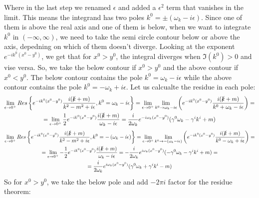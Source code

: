 \documentclass{article}
\begin{document}
Where in the last step we renamed $\epsilon$ and added a $\epsilon^2$ term that vanishes in the limit. This means the integrand has two poles $k^0 = \pm \left(\omega_k - i\epsilon\right)$. Since one of them is above the real axis and one of them is below, when we want to integrate $k^0$ in $(-\infty, \infty)$, we need to take the semi circle contour below or above the axis, depedning on which of them doesn't diverge. Looking at the exponent $e^{-ik^0(x^0 - y^0)}$, we get that for $x^0 > y^0$, the integral diverges when $\Im(k^0) > 0$ and vise versa. So, we take the below contour if $x^0 > y^0$ and the above contour if $x^0 < y^0$. The below contour contains the pole $k^0 = \omega_k - i\epsilon$ while the above contour contains the pole $k^0 = - \omega_k + i\epsilon$. Let us calcualte the residue in each pole:
\begin{equation}
\begin{gathered}
    \lim_{\epsilon\rightarrow0^{+}} Res\left\{e^{-ik^0(x^0 - y^0)}\frac{i(\slashed{k} +m )}{k^2 - m^2 + i\epsilon}, k^0 = \omega_k - i\epsilon\right\} =
    \lim_{\epsilon\rightarrow0^{+}} \lim_{k^0 \rightarrow \omega_k - i\epsilon}
    \left(e^{-ik^0(x^0 - y^0)}\frac{i(\slashed{k} + m)}{k^0 + \omega_k - i\epsilon}\right) = \\ =
    \lim_{\epsilon\rightarrow0^{+}} \frac{1}{2}e^{-ik^0(x^0 - y^0)}\frac{i(\slashed{k} + m)}{\omega_k - i\epsilon} = \frac{i}{2\omega_k}e^{-i\omega_k(x^0 - y^0)}(\gamma^0 \omega_k - \gamma^ik^i + m)
\end{gathered}
\end{equation}
\begin{equation}
\begin{gathered}
    \lim_{\epsilon\rightarrow0^{+}} Res\left\{e^{-ik^0(x^0 - y^0)}\frac{i(\slashed{k} +m )}{k^2 - m^2 + i\epsilon}, k^0 = - \left(\omega_k - i\epsilon\right)\right\} =
    \lim_{\epsilon\rightarrow0^{+}} \lim_{k^0 \rightarrow - \left(\omega_k - i\epsilon\right)}
    \left(e^{-ik^0(x^0 - y^0)}\frac{i(\slashed{k} + m)}{k^0 - \omega_k + i\epsilon}\right) = \\ =
    \lim_{\epsilon\rightarrow0^{+}} -\frac{1}{2}e^{-ik^0(x^0 - y^0)}\frac{i(\slashed{k} + m)}{\omega_k - i\epsilon} = -\frac{i}{2\omega_k}e^{i\omega_k(x^0 - y^0)}(-\gamma^0\omega_k - \gamma^ik^i + m) = \\ = \frac{i}{2\omega_k}e^{i\omega_k(x^0 - y^0)}(\gamma^0\omega_k + \gamma^ik^i - m)
\end{gathered}
\end{equation}
So for $x^0 > y^0$, we take the below pole and add $-2\pi i$ factor for the residue theorem:
\end{document}
